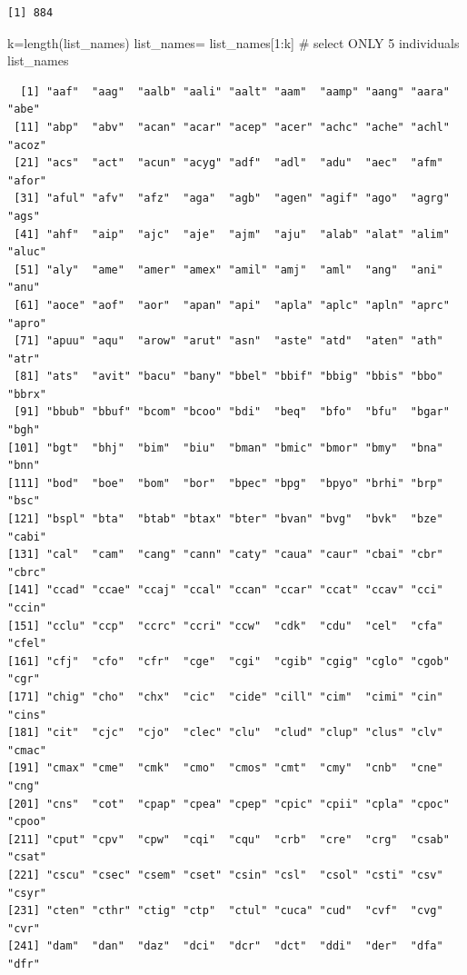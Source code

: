 \documentclass[
  letterpaper,
  DIV=11,
  numbers=noendperiod]{scrreprt}
\newenvironment{Shaded}{\begin{snugshade}}{\end{snugshade}}
\newcommand{\CommentTok}[1]{\textcolor[rgb]{0.37,0.37,0.37}{#1}}
\newcommand{\DecValTok}[1]{\textcolor[rgb]{0.68,0.00,0.00}{#1}}
\newcommand{\FunctionTok}[1]{\textcolor[rgb]{0.28,0.35,0.67}{#1}}
\newcommand{\NormalTok}[1]{\textcolor[rgb]{0.00,0.23,0.31}{#1}}
\newcommand{\OtherTok}[1]{\textcolor[rgb]{0.00,0.23,0.31}{#1}}
\newcommand{\SpecialCharTok}[1]{\textcolor[rgb]{0.37,0.37,0.37}{#1}}
\begin{document}
\begin{verbatim}
[1] 884
\end{verbatim}

\begin{Shaded}
\begin{Highlighting}[]
\NormalTok{k}\OtherTok{=}\FunctionTok{length}\NormalTok{(list\_names)}
\NormalTok{list\_names}\OtherTok{=}\NormalTok{ list\_names[}\DecValTok{1}\SpecialCharTok{:}\NormalTok{k] }\CommentTok{\# select ONLY 5 individuals}
\NormalTok{list\_names}
\end{Highlighting}
\end{Shaded}

\begin{verbatim}
  [1] "aaf"  "aag"  "aalb" "aali" "aalt" "aam"  "aamp" "aang" "aara" "abe" 
 [11] "abp"  "abv"  "acan" "acar" "acep" "acer" "achc" "ache" "achl" "acoz"
 [21] "acs"  "act"  "acun" "acyg" "adf"  "adl"  "adu"  "aec"  "afm"  "afor"
 [31] "aful" "afv"  "afz"  "aga"  "agb"  "agen" "agif" "ago"  "agrg" "ags" 
 [41] "ahf"  "aip"  "ajc"  "aje"  "ajm"  "aju"  "alab" "alat" "alim" "aluc"
 [51] "aly"  "ame"  "amer" "amex" "amil" "amj"  "aml"  "ang"  "ani"  "anu" 
 [61] "aoce" "aof"  "aor"  "apan" "api"  "apla" "aplc" "apln" "aprc" "apro"
 [71] "apuu" "aqu"  "arow" "arut" "asn"  "aste" "atd"  "aten" "ath"  "atr" 
 [81] "ats"  "avit" "bacu" "bany" "bbel" "bbif" "bbig" "bbis" "bbo"  "bbrx"
 [91] "bbub" "bbuf" "bcom" "bcoo" "bdi"  "beq"  "bfo"  "bfu"  "bgar" "bgh" 
[101] "bgt"  "bhj"  "bim"  "biu"  "bman" "bmic" "bmor" "bmy"  "bna"  "bnn" 
[111] "bod"  "boe"  "bom"  "bor"  "bpec" "bpg"  "bpyo" "brhi" "brp"  "bsc" 
[121] "bspl" "bta"  "btab" "btax" "bter" "bvan" "bvg"  "bvk"  "bze"  "cabi"
[131] "cal"  "cam"  "cang" "cann" "caty" "caua" "caur" "cbai" "cbr"  "cbrc"
[141] "ccad" "ccae" "ccaj" "ccal" "ccan" "ccar" "ccat" "ccav" "cci"  "ccin"
[151] "cclu" "ccp"  "ccrc" "ccri" "ccw"  "cdk"  "cdu"  "cel"  "cfa"  "cfel"
[161] "cfj"  "cfo"  "cfr"  "cge"  "cgi"  "cgib" "cgig" "cglo" "cgob" "cgr" 
[171] "chig" "cho"  "chx"  "cic"  "cide" "cill" "cim"  "cimi" "cin"  "cins"
[181] "cit"  "cjc"  "cjo"  "clec" "clu"  "clud" "clup" "clus" "clv"  "cmac"
[191] "cmax" "cme"  "cmk"  "cmo"  "cmos" "cmt"  "cmy"  "cnb"  "cne"  "cng" 
[201] "cns"  "cot"  "cpap" "cpea" "cpep" "cpic" "cpii" "cpla" "cpoc" "cpoo"
[211] "cput" "cpv"  "cpw"  "cqi"  "cqu"  "crb"  "cre"  "crg"  "csab" "csat"
[221] "cscu" "csec" "csem" "cset" "csin" "csl"  "csol" "csti" "csv"  "csyr"
[231] "cten" "cthr" "ctig" "ctp"  "ctul" "cuca" "cud"  "cvf"  "cvg"  "cvr" 
[241] "dam"  "dan"  "daz"  "dci"  "dcr"  "dct"  "ddi"  "der"  "dfa"  "dfr" 

\end{verbatim}
\end{document}
